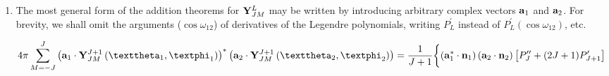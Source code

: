 \begin{enumerate}[label=(\alph*)]
\begin{align}
\end{align}
\begin{align}
& 4 \pi \sum_{M=-J}^{J} \vect{Y}_{J M}^{J *}\left(\vartheta_{1}, \varphi_{1}\right) \times \vect{Y}_{J M}^{J}\left(\vartheta_{2}, \varphi_{2}\right)=\frac{(2 J+1)}{J(J+1)}\left[\vect{n}_{1} \times \vect{n}_{2}\right] P_{J}^{\prime}\left(\cos \omega_{12}\right), \label{eq:7:3:104}\\
& 4 \pi \sum_{M=-J}^{J} \vect{Y}_{J M}^{J *}\left(\vartheta_{1}, \varphi_{1}\right) \times \vect{Y}_{J M}^{J-1}\left(\vartheta_{2}, \varphi_{2}\right)=-i \frac{\sqrt{(J+1)(2 J+1)}}{J}\left\{\vect{n}_{1} P_{J}^{\prime}\left(\cos \omega_{12}\right)-\vect{n}_{2} P_{J-1}^{\prime}\left(\cos \omega_{12}\right)\right\}, \notag
\end{align}
\begin{align}
& 4 \pi \sum_{M=-J}^{J} \vect{Y}_{J M}^{J-1 *}\left(\vartheta_{1}, \varphi_{1}\right) \times \vect{Y}_{J M}^{J+1}\left(\vartheta_{2}, \varphi_{2}\right)=0, \notag\\
& 4 \pi \sum_{M=-J}^{J} \vect{Y}_{J M}^{J-1 *}\left(\vartheta_{1}, \varphi_{1}\right) \times \vect{Y}_{J M}^{J}\left(\vartheta_{2}, \varphi_{2}\right)=i \frac{\sqrt{(J+1)(2 J+1)}}{J}\left\{\vect{n}_{1} P_{J-1}^{\prime}\left(\cos \omega_{12}\right)-\vect{n}_{2} P_{J}^{\prime}\left(\cos \omega_{12}\right)\right\}, \label{eq:7:3:105}\\
& 4 \pi \sum_{M=-J}^{J} \vect{Y}_{J M}^{J-1 *}\left(\vartheta_{1}, \varphi_{1}\right) \times \vect{Y}_{J M}^{J-1}\left(\vartheta_{2}, \varphi_{2}\right)=-\frac{2 J+1}{J}\left[\vect{n}_{1} \times \vect{n}_{2}\right] P_{J-1}^{\prime}\left(\cos \omega_{12}\right) . \notag
\end{align}
In these equations $P_{L}(x)$ is a Legendre polynomial, and $P_{L}^{\prime}(x) \equiv \dd P_{L}(x) / \dd x$. Analogous equations for $\vect{Y}_{J M}^{(\lambda)}$ may be obtained from Eqs.~\eqref{eq:7:3:9}-\eqref{eq:7:3:10}.
\item The most general form of the addition theorems for $\mathbf{Y}_{J M}^{L}$ may be written by introducing arbitrary complex vectors $\mathbf{a}_{1}$ and $\mathbf{a}_{2}$. For brevity, we shall omit the arguments ($\cos \omega_{12}$) of derivatives of the Legendre polynomials, writing $P_{L}^{\prime}$ instead of $P_{L}^{\prime}\left(\cos \omega_{12}\right)$, etc.
\begin{fleqn}
\begin{subequations}
    \begin{align}
 4 \pi &\sum_{M=-J}^{J}\left(\vect{a}_{1} \cdot \vect{Y}_{J M}^{J+1}\left(\vartheta_{1}, \varphi_{1}\right)\right)^{*}\left(\vect{a}_{2} \cdot \vect{Y}_{J M}^{J+1}\left(\vartheta_{2}, \varphi_{2}\right)\right)=\frac{1}{J+1}\biggl\{\left(\vect{a}_{1}^{*} \cdot \vect{n}_{1}\right)\left(\vect{a}_{2} \cdot \vect{n}_{2}\right)\left[P_{J}^{\prime \prime}+(2 J+1) P_{J+1}^{\prime}\right] \notag \\

\end{align}
\end{subequations}
\end{fleqn}
\end{enumerate}
